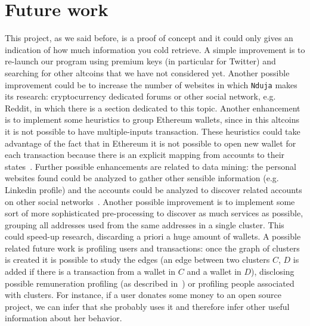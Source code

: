 \section{Future work}
\label{future}
This project, as we said before, is a proof of concept and it could only gives
an indication of how much information you cold retrieve. A simple improvement
is to re-launch our program using premium keys (in particular for Twitter) and
searching for other altcoins that we have not considered yet. Another possible
improvement could be to increase the number of websites in which \texttt{Nduja}
makes its research: cryptocurrency dedicated forums or other social network,
e.g. Reddit, in which there is a section dedicated to this topic. Another
enhancement is to implement some heuristics to group Ethereum wallets, since in
this altcoins it is not possible to have multiple-inputs transaction. These
heuristics could take advantage of the fact that in Ethereum it is
not possible to open new wallet for each transaction because there is an
explicit mapping from accounts to their states~\cite{bib:ethersok}.
Further possible enhancements are related to data mining: 
the personal websites found could be analyzed to gather other sensible
information (e.g. Linkedin profile) and the accounts could be analyzed to
discover related accounts on other social networks~\cite{bib:osinference}.
Another possible improvement is to implement some sort of more sophisticated
pre-processing to discover as much services as possible, grouping all addresses
used from the same addresses in a single cluster. This could speed-up research,
discarding a priori a huge amount of wallets. A possible related future work is
profiling users and transactions: once the graph of clusters is created it is
possible to study the edges (an edge between two clusters $C$, $D$ is added
if there is a transaction from a wallet in $C$ and a wallet in $D$), disclosing
possible remuneration profiling (as described in~\cite{bib:fullDiscl}) or
profiling people associated with clusters.
For instance, if a user donates some money to an open source project,
we can infer that she probably uses it and therefore infer other useful
information about her behavior.

